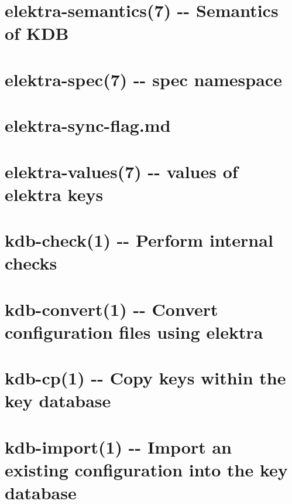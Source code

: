\documentclass[twoside]{book}
\newcommand{\+}{\discretionary{\mbox{\scriptsize$\hookleftarrow$}}{}{}}
\begin{document}
\chapter{elektra-\/semantics(7) -\/-\/ Semantics of K\+D\+B}
\label{md_doc_help_elektra-semantics}
\hypertarget{md_doc_help_elektra-semantics}{}

\chapter{elektra-\/spec(7) -\/-\/ spec namespace}
\label{md_doc_help_elektra-spec}
\hypertarget{md_doc_help_elektra-spec}{}

\chapter{elektra-\/sync-\/flag.md}
\label{doc_help_elektra-sync-flag_md}
\hypertarget{doc_help_elektra-sync-flag_md}{}

\chapter{elektra-\/values(7) -\/-\/ values of elektra keys}
\label{md_doc_help_elektra-values}
\hypertarget{md_doc_help_elektra-values}{}

\chapter{kdb-\/check(1) -\/-\/ Perform internal checks}
\label{md_doc_help_kdb-check}
\hypertarget{md_doc_help_kdb-check}{}

\chapter{kdb-\/convert(1) -\/-\/ Convert configuration files using elektra}
\label{md_doc_help_kdb-convert}
\hypertarget{md_doc_help_kdb-convert}{}

\chapter{kdb-\/cp(1) -\/-\/ Copy keys within the key database}
\label{md_doc_help_kdb-cp}
\hypertarget{md_doc_help_kdb-cp}{}

\chapter{kdb-\/import(1) -\/-\/ Import an existing configuration into the key database}
\label{md_doc_help_kdb-editor}
\hypertarget{md_doc_help_kdb-editor}{}

\end{document}
